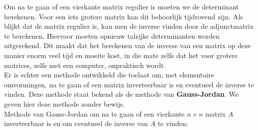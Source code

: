 Om na te gaan of een vierkante matrix regulier is moeten we de determinant berekenen. Voor een iets grotere matrix kan dit behoorlijk tijdrovend zijn. Als blijkt dat de matrix regulier is, kan men de inverse vinden door de adjunctmatrix te berekenen. Hiervoor moeten opnieuw talrijke determinanten worden uitgerekend. Dit maakt dat het berekenen van de inverse van een matrix op deze manier enorm veel tijd en moeite kost, in die mate zelfs dat het voor grotere matrices, zelfs met een computer, onpraktisch wordt.\\

Er is echter een methode ontwikkeld die toelaat om, met elementaire omvormingen, na te gaan of een matrix inverteerbaar is en eventueel de inverse te vinden. Deze methode staat bekend als de methode van {\bf Gauss-Jordan}. 
We geven hier deze methode zonder bewijs.\\

Methode van Gauss-Jordan om na te gaan of een vierkante $n \times n$ matrix $A$ inverteerbaar is en om eventueel de inverse van $A$ te vinden:\\

